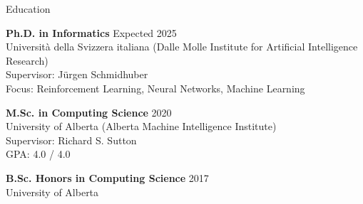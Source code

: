 \documentclass{cv}
\begin{document}

\begin{rSection}{Education}

{\bf Ph.D. in Informatics} \hfill Expected 2025 \vspace{0.05em}\\
Universit{\`{a}} della Svizzera italiana (Dalle Molle Institute for Artificial Intelligence Research) \vspace{0.05em}\\
Supervisor: J{\"u}rgen Schmidhuber \vspace{0.05em}\\
Focus: Reinforcement Learning, Neural Networks, Machine Learning


{\bf M.Sc. in Computing Science} \hfill 2020 \vspace{0.05em}\\
University of Alberta (Alberta Machine Intelligence Institute) \vspace{0.05em}\\
Supervisor: Richard S. Sutton \vspace{0.05em}\\
GPA: 4.0 / 4.0


{\bf B.Sc. Honors in Computing Science} \hfill 2017 \vspace{0.05em}\\
University of Alberta

\end{rSection}

\end{document}
